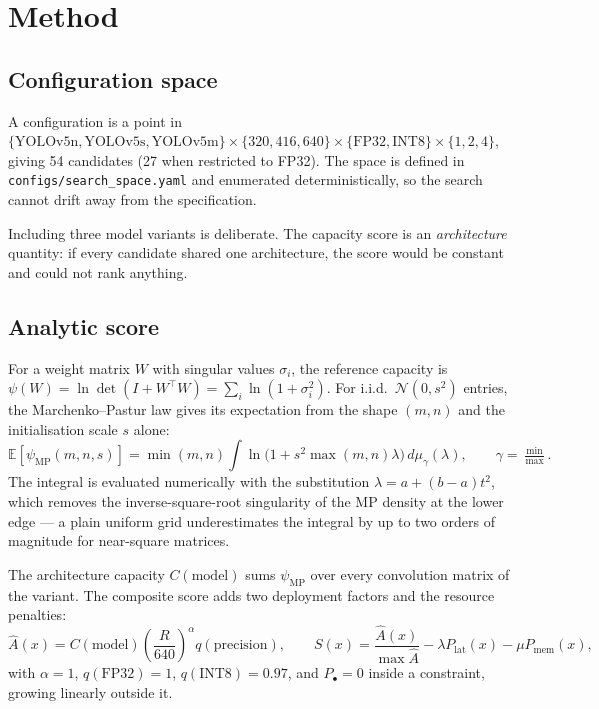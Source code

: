 \documentclass[11pt,a4paper]{article}
\begin{document}
\section{Method}

\subsection{Configuration space}

A configuration is a point in
$\{\text{YOLOv5n},\text{YOLOv5s},\text{YOLOv5m}\} \times \{320,416,640\}
\times \{\text{FP32},\text{INT8}\} \times \{1,2,4\}$, giving 54 candidates
(27 when restricted to FP32). The space is defined in
\texttt{configs/search\_space.yaml} and enumerated deterministically, so the
search cannot drift away from the specification.

Including three model variants is deliberate. The capacity score is an
\emph{architecture} quantity: if every candidate shared one architecture, the
score would be constant and could not rank anything.

\subsection{Analytic score}

For a weight matrix $W$ with singular values $\sigma_i$, the reference capacity
is $\psi(W)=\ln\det(I+W^\top W)=\sum_i \ln(1+\sigma_i^2)$. For i.i.d.\
$\mathcal{N}(0,s^2)$ entries, the Marchenko--Pastur law gives its expectation
from the shape $(m,n)$ and the initialisation scale $s$ alone:
\begin{equation}
\mathbb{E}[\psi_{\mathrm{MP}}(m,n,s)]
= \min(m,n)\int \ln\!\big(1+s^2\max(m,n)\lambda\big)\,d\mu_{\gamma}(\lambda),
\qquad \gamma=\tfrac{\min}{\max}.
\end{equation}
The integral is evaluated numerically with the substitution
$\lambda = a + (b-a)t^2$, which removes the inverse-square-root singularity of
the MP density at the lower edge --- a plain uniform grid underestimates the
integral by up to two orders of magnitude for near-square matrices.

The architecture capacity $C(\text{model})$ sums $\psi_{\mathrm{MP}}$ over every
convolution matrix of the variant. The composite score adds two deployment
factors and the resource penalties:
\begin{equation}
\hat A(x)=C(\text{model})\left(\frac{R}{640}\right)^{\alpha} q(\text{precision}),
\qquad
S(x)=\frac{\hat A(x)}{\max \hat A}
-\lambda P_{\text{lat}}(x)-\mu P_{\text{mem}}(x),
\end{equation}
with $\alpha=1$, $q(\text{FP32})=1$, $q(\text{INT8})=0.97$, and $P_\bullet=0$
inside a constraint, growing linearly outside it.
\end{document}
